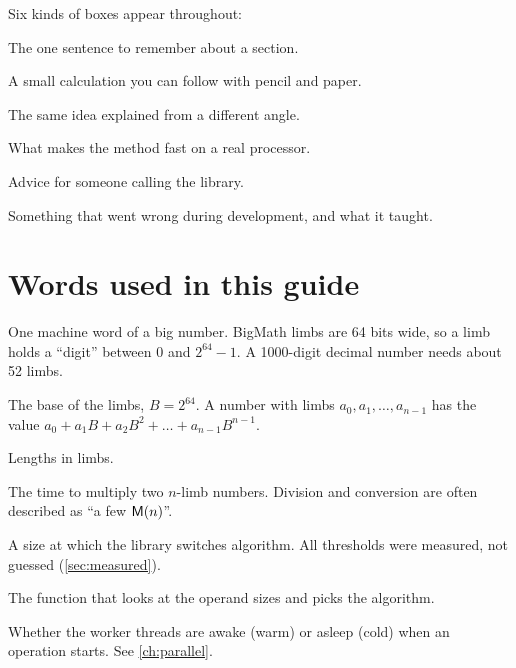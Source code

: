 Six kinds of boxes appear throughout:

\begin{keyidea}
The one sentence to remember about a section.
\end{keyidea}
\begin{example}
A small calculation you can follow with pencil and paper.
\end{example}
\begin{another}
The same idea explained from a different angle.
\end{another}
\begin{perfnote}
What makes the method fast on a real processor.
\end{perfnote}
\begin{practice}
Advice for someone calling the library.
\end{practice}
\begin{pitfall}
Something that went wrong during development, and what it taught.
\end{pitfall}

\section{Words used in this guide}

\begin{description}[leftmargin=2.2cm,style=nextline]
  \item[limb] One machine word of a big number. BigMath limbs are 64 bits wide,
        so a limb holds a ``digit'' between $0$ and $2^{64}-1$. A 1000-digit decimal
        number needs about 52 limbs.
  \item[$B$] The base of the limbs, $B = 2^{64}$. A number with limbs
        $a_0, a_1, \dots, a_{n-1}$ has the value
        $a_0 + a_1 B + a_2 B^2 + \dots + a_{n-1}B^{n-1}$.
  \item[$n$, $n_a$, $n_b$] Lengths in limbs.
  \item[$\M(n)$] The time to multiply two $n$-limb numbers. Division and
        conversion are often described as ``a few $\M(n)$''.
  \item[threshold] A size at which the library switches algorithm. All
        thresholds were measured, not guessed (\cref{sec:measured}).
  \item[dispatcher] The function that looks at the operand sizes and picks the
        algorithm.
  \item[warm / cold pool] Whether the worker threads are awake (warm) or asleep
        (cold) when an operation starts. See \cref{ch:parallel}.
\end{description}

